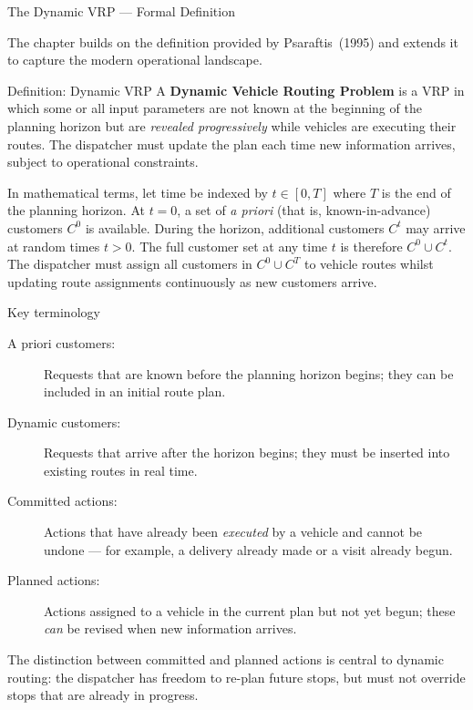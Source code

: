 \documentclass[aspectratio=169,10pt]{beamer}
\begin{document}
\begin{frame}[allowframebreaks]{The Dynamic VRP — Formal Definition}

  The chapter builds on the definition provided by Psaraftis~(1995) and extends
  it to capture the modern operational landscape.

  \begin{block}{Definition: Dynamic VRP}
    A \textbf{Dynamic Vehicle Routing Problem} is a VRP in which some or all
    input parameters are not known at the beginning of the planning horizon
    but are \emph{revealed progressively} while vehicles are executing their
    routes.  The dispatcher must update the plan each time new information
    arrives, subject to operational constraints.
  \end{block}

  In mathematical terms, let time be indexed by $t \in [0, T]$ where $T$ is
  the end of the planning horizon.  At $t = 0$, a set of \emph{a priori} (that
  is, known-in-advance) customers $C^0$ is available.  During the horizon,
  additional customers $C^t$ may arrive at random times $t > 0$.
  The full customer set at any time $t$ is therefore $C^0 \cup C^t$.
  The dispatcher must assign all customers in $C^0 \cup C^T$ to vehicle routes
  whilst updating route assignments continuously as new customers arrive.

  \framebreak

  \begin{block}{Key terminology}
    \begin{description}
      \item[A priori customers:] Requests that are known before the planning
        horizon begins; they can be included in an initial route plan.
      \item[Dynamic customers:] Requests that arrive after the horizon begins;
        they must be inserted into existing routes in real time.
      \item[Committed actions:] Actions that have already been \emph{executed}
        by a vehicle and cannot be undone — for example, a delivery already
        made or a visit already begun.
      \item[Planned actions:] Actions assigned to a vehicle in the current plan
        but not yet begun; these \emph{can} be revised when new information arrives.
    \end{description}
  \end{block}

  The distinction between committed and planned actions is central to dynamic
  routing: the dispatcher has freedom to re-plan future stops, but must not
  override stops that are already in progress.


\end{frame}
\end{document}

